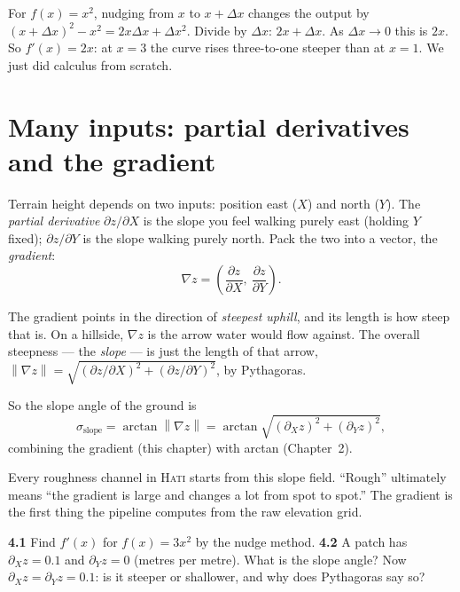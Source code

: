 \documentclass[11pt,oneside]{book}
\newcommand{\norm}[1]{\left\lVert #1\right\rVert}
\begin{document}
\begin{example}
For $f(x)=x^2$, nudging from $x$ to $x+\Delta x$ changes the output by
$(x+\Delta x)^2-x^2=2x\Delta x+\Delta x^2$. Divide by $\Delta x$: $2x+\Delta x$. As
$\Delta x\to0$ this is $2x$. So $f'(x)=2x$: at $x=3$ the curve rises three-to-one
steeper than at $x=1$. We just did calculus from scratch.
\end{example}

\section{Many inputs: partial derivatives and the gradient}
Terrain height depends on two inputs: position east ($X$) and north ($Y$). The
\emph{partial derivative} $\partial z/\partial X$ is the slope you feel walking purely
east (holding $Y$ fixed); $\partial z/\partial Y$ is the slope walking purely north.
Pack the two into a vector, the \emph{gradient}:
\begin{equation}
\nabla z=\left(\frac{\partial z}{\partial X},\ \frac{\partial z}{\partial Y}\right).
\end{equation}

\begin{keyidea}
The gradient points in the direction of \emph{steepest uphill}, and its length is how
steep that is. On a hillside, $\nabla z$ is the arrow water would flow against. The
overall steepness --- the \emph{slope} --- is just the length of that arrow,
$\norm{\nabla z}=\sqrt{(\partial z/\partial X)^2+(\partial z/\partial Y)^2}$, by
Pythagoras.
\end{keyidea}

So the slope angle of the ground is
\begin{equation}
\sigma_{\text{slope}}=\arctan\norm{\nabla z}=\arctan\sqrt{(\partial_X z)^2+(\partial_Y z)^2},
\end{equation}
combining the gradient (this chapter) with arctan (Chapter~2).

\begin{hatibox}
Every roughness channel in \textsc{Hati} starts from this slope field. ``Rough''
ultimately means ``the gradient is large and changes a lot from spot to spot.'' The
gradient is the first thing the pipeline computes from the raw elevation grid.
\end{hatibox}

\begin{practice}
\textbf{4.1} Find $f'(x)$ for $f(x)=3x^2$ by the nudge method. \quad\textbf{4.2} A
patch has $\partial_X z=0.1$ and $\partial_Y z=0$ (metres per metre). What is the slope
angle? Now $\partial_X z=\partial_Y z=0.1$: is it steeper or shallower, and why does
Pythagoras say so?
\end{practice}
\end{document}
